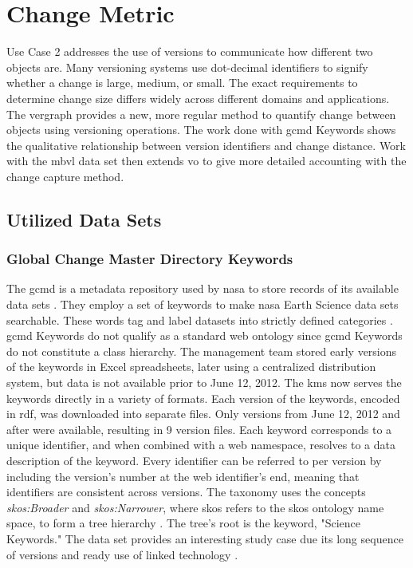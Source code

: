 \section{Change Metric} \label{ch:distance}

Use Case 2 addresses the use of \glspl{version} to communicate how different two objects are.
Many versioning systems use dot-decimal identifiers to signify whether a change is large, medium, or small.
The exact requirements to determine change size differs widely across different domains and applications.
The \gls{vergraph} provides a new, more regular method to quantify change between objects using versioning operations.
The work done with \gls{gcmd} Keywords shows the qualitative relationship between version identifiers and change distance.
Work with the \gls{mbvl} data set then extends \gls{vo} to give more detailed accounting with the change capture method.

\subsection{Utilized Data Sets}

\subsubsection{Global Change Master Directory Keywords}

The \gls{gcmd} is a metadata repository used by \gls{nasa} to store records of its available data sets \cite{Miled:2001:GCM:372202.372324}.
They employ a set of keywords to make \gls{nasa} Earth Science data sets searchable.
These words tag and label datasets into strictly defined categories \cite{GCMDKey}.
\gls{gcmd} Keywords do not qualify as a standard web ontology since \gls{gcmd} Keywords do not constitute a class hierarchy.
The management team stored early versions of the keywords in Excel spreadsheets, later using a centralized distribution system, but data is not available prior to June 12, 2012.
The \gls{kms} now serves the keywords directly in a variety of formats.
Each version of the keywords, encoded in \gls{rdf}, was downloaded into separate files.
Only versions from June 12, 2012 and after were available, resulting in 9 version files.
Each keyword corresponds to a unique identifier, and when combined with a web namespace, resolves to a data description of the keyword.
Every identifier can be referred to per version by including the version's number at the web identifier's end, meaning that identifiers are consistent across versions.
The taxonomy uses the concepts \textit{skos:Broader} and \textit{skos:Narrower}, where skos refers to the \gls{skos} ontology name space, to form a tree hierarchy \cite{skos}.
The tree's root is the keyword, "Science Keywords."
The data set provides an interesting study case due its long sequence of versions and ready use of \gls{linked} technology \cite{Stevens2016}.

